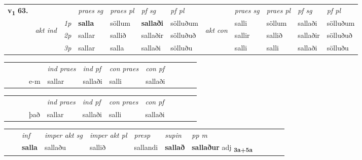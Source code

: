 \begin{tabular}{llllllllllll} \toprule
\multirow{4}{*}{{{\textbf{v{\textsubscript{1}}} \Large{\textbf{63.}}}}}  & &   &  \textit{praes sg}  & \textit{praes pl}  &\textit{ pf sg} & \textit{pf pl} &  &  \textit{praes sg}  & \textit{praes pl}  & \textit{pf sg} & \textit{pf pl } \\*
	\cmidrule{4-7} \cmidrule{9-12}
 & \multirow{3}{*}{\begin{turn}{90}\textit{akt ind}\end{turn}} & {\textit{1p}} & \textbf{salla} & söllum    & \textbf{sallaði} & sölluðum & \multirow{3}{*}{\begin{turn}{90}\textit{akt con}\end{turn}} &salli & söllum & sallaði & sölluðum\\*
& &  {\textit{2p}} &  sallar  & sallið   & sallaðir & sölluðuð & & sallir & sallið & sallaðir & sölluðuð \\*
& &  {\textit{3p}} & sallar & salla   & sallaði & sölluðu & & salli & salli& sallaði & sölluðu  \\*
\cmidrule{4-7} \cmidrule{9-12}
\end{tabular}


\begin{tabular}{llllllllllll}
 & &  & &  \textit{ind praes} & \textit{ind pf} & \textit{con praes} & \textit{con pf} \\*
&  & & e-m & sallar & sallaði & salli & sallaði \\*
\cmidrule{5-9}
\end{tabular}


\begin{tabular}{llllllllllll}
 & &  & &  \textit{ind praes} & \textit{ind pf} & \textit{con praes} & \textit{con pf} \\*
&  & & það & sallar & sallaði & salli & sallaði \\*
\cmidrule{5-9}
\end{tabular}


\begin{tabular}{llllllllllll}
 & & \textit{inf} & \textit{imper akt sg} & \textit{imper akt pl}   & \textit{presp} & \textit{supin}  & \textit{pp m}     \\*
  & & \textbf{salla} & sallaðu  & sallið   & sallandi &  \textbf{sallað}  & \textbf{sallaður} adj \textbf{\textsubscript{3a+5a}} \\*
\cmidrule{1-12}
\end{tabular}



